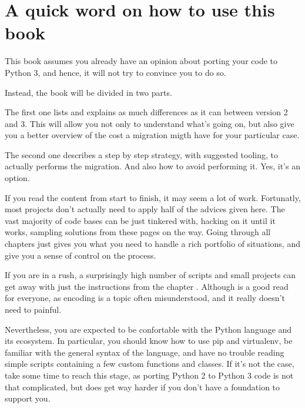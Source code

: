 
\chapter{A quick word on how to use this book}

This book assumes you already have an opinion about porting your code to Python 3, and hence, it will not try to convince you to do so.

Instead, the book will be divided in two parts.

The first one lists and explains as much differences as it can between version 2 and 3. This will allow you not only to understand what's going on, but also give you a better overview of the cost a migration migth have for your particular case.

The second one describes a step by step strategy, with suggested tooling, to actually performs the migration. And also how to avoid performing it. Yes, it's an option.

If you read the content from start to finish, it may seem a lot of work. Fortunatly, most projects  don't actually need to apply half of the advices given here. The vast majority of code bases can be just tinkered with, hacking on it until it works, sampling solutions from these pages on the way. Going through all chapters just gives you what you need to handle a rich portfolio of situations, and give you a sense of control on the process.

If you are in a rush, a surprisingly high number of scripts and small projects can get away with just the instructions from the chapter . Although  is a good read for everyone, as encoding is a topic often misunderstood, and it really doesn't need to painful.

\begin{warning}
    Nevertheless, you are expected to be confortable with the Python language and its ecosystem. In particular, you should know how to use pip and virtualenv, be familiar with the general syntax of the language, and have no trouble reading simple scripts containing a few custom functions and classes. If it's not the case, take some time to reach this stage, as porting Python 2 to Python 3 code is not that complicated, but does get way harder if you don't have a foundation to support you.
\end{warning}

